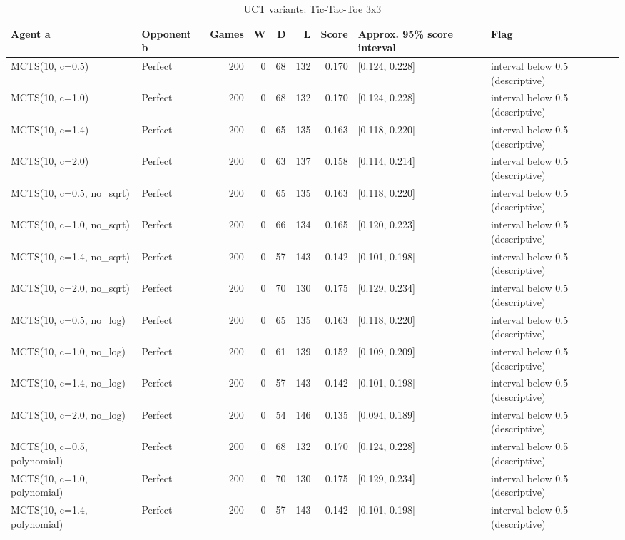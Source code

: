 \begin{table}[!t]
\centering
\caption{UCT variants: Tic-Tac-Toe 3x3}
\label{tab:formula_ttt3}
\small
\begin{tabular}{llrrrrrll}
\toprule
Agent a & Opponent b & Games & W & D & L & Score & Approx. 95\% score interval & Flag \\
\midrule
MCTS(10, c=0.5) & Perfect & 200 & 0 & 68 & 132 & 0.170 & [0.124, 0.228] & interval below 0.5 (descriptive) \\
MCTS(10, c=1.0) & Perfect & 200 & 0 & 68 & 132 & 0.170 & [0.124, 0.228] & interval below 0.5 (descriptive) \\
MCTS(10, c=1.4) & Perfect & 200 & 0 & 65 & 135 & 0.163 & [0.118, 0.220] & interval below 0.5 (descriptive) \\
MCTS(10, c=2.0) & Perfect & 200 & 0 & 63 & 137 & 0.158 & [0.114, 0.214] & interval below 0.5 (descriptive) \\
MCTS(10, c=0.5, no\_sqrt) & Perfect & 200 & 0 & 65 & 135 & 0.163 & [0.118, 0.220] & interval below 0.5 (descriptive) \\
MCTS(10, c=1.0, no\_sqrt) & Perfect & 200 & 0 & 66 & 134 & 0.165 & [0.120, 0.223] & interval below 0.5 (descriptive) \\
MCTS(10, c=1.4, no\_sqrt) & Perfect & 200 & 0 & 57 & 143 & 0.142 & [0.101, 0.198] & interval below 0.5 (descriptive) \\
MCTS(10, c=2.0, no\_sqrt) & Perfect & 200 & 0 & 70 & 130 & 0.175 & [0.129, 0.234] & interval below 0.5 (descriptive) \\
MCTS(10, c=0.5, no\_log) & Perfect & 200 & 0 & 65 & 135 & 0.163 & [0.118, 0.220] & interval below 0.5 (descriptive) \\
MCTS(10, c=1.0, no\_log) & Perfect & 200 & 0 & 61 & 139 & 0.152 & [0.109, 0.209] & interval below 0.5 (descriptive) \\
MCTS(10, c=1.4, no\_log) & Perfect & 200 & 0 & 57 & 143 & 0.142 & [0.101, 0.198] & interval below 0.5 (descriptive) \\
MCTS(10, c=2.0, no\_log) & Perfect & 200 & 0 & 54 & 146 & 0.135 & [0.094, 0.189] & interval below 0.5 (descriptive) \\
MCTS(10, c=0.5, polynomial) & Perfect & 200 & 0 & 68 & 132 & 0.170 & [0.124, 0.228] & interval below 0.5 (descriptive) \\
MCTS(10, c=1.0, polynomial) & Perfect & 200 & 0 & 70 & 130 & 0.175 & [0.129, 0.234] & interval below 0.5 (descriptive) \\
MCTS(10, c=1.4, polynomial) & Perfect & 200 & 0 & 57 & 143 & 0.142 & [0.101, 0.198] & interval below 0.5 (descriptive) \\

\end{tabular}
\end{table}
